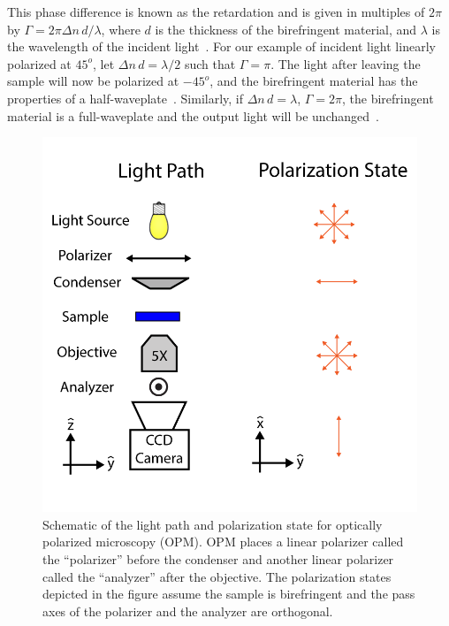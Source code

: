 This phase difference is known as the retardation and is given in multiples of $2 \pi$ by $\Gamma = 2 \pi \Delta n \, d / \lambda$, where $d$ is the thickness of the birefringent material, and $\lambda$ is the wavelength of the incident light~\cite{RN232}.
For our example of incident light linearly polarized at $45^o$, let $\Delta n \, d = \lambda / 2$ such that $\Gamma =  \pi$.
The light after leaving the sample will now be polarized at $-45^o$, and the birefringent material has the properties of a half-waveplate~\cite{RN232}.
Similarly, if $\Delta n \, d = \lambda$, $\Gamma =  2 \pi$, the birefringent material is a full-waveplate and the output light will be unchanged~\cite{RN232}.\\

\begin{figure}[h]
  \centering
  \includegraphics{figures/C2/Ch2-Figs_OPMSchem.png}
  \caption{Schematic of the light path and polarization state for optically polarized microscopy (OPM). OPM places a linear polarizer called the ``polarizer'' before the condenser and another linear polarizer called the ``analyzer'' after the objective. The polarization states depicted in the figure assume the sample is birefringent and the pass axes of the polarizer and the analyzer are orthogonal.}\label{f:2-OPMSchem}
\end{figure}


